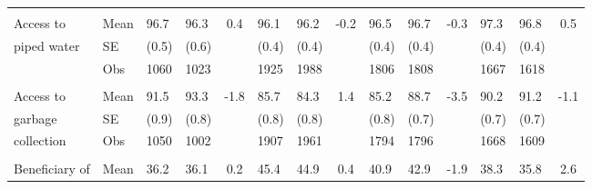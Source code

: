 \documentclass[
	article,			%
	12pt,				%
	oneside,			%
	a4paper,			%
	]{article}
\begin{document}
\begin{table}[h!]
\begin{tabular}{lp{2.335em}p{1.665em}p{1.665em}cp{1.665em}p{1.665em}cp{1.665em}p{1.665em}cp{1.665em}p{1.665em}c}
           &            &            &            &            &            &            &            &            &            &            &            &            &            \\

Access to  &       Mean &       96.7 &       96.3 &        0.4 &       96.1 &       96.2 &       -0.2 &       96.5 &       96.7 &       -0.3 &       97.3 &       96.8 &        0.5 \\

piped water &         SE &      (0.5) &      (0.6) &            &      (0.4) &      (0.4) &            &      (0.4) &      (0.4) &            &      (0.4) &      (0.4) &            \\

           &        Obs &       1060 &       1023 &            &       1925 &       1988 &            &       1806 &       1808 &            &       1667 &       1618 &            \\

           &            &            &            &            &            &            &            &            &            &            &            &            &            \\

Access to  &       Mean &       91.5 &       93.3 &       -1.8 &       85.7 &       84.3 &        1.4 &       85.2 &       88.7 &    -3.5 &       90.2 &       91.2 &       -1.1 \\

  garbage  &         SE &      (0.9) &      (0.8) &            &      (0.8) &      (0.8) &            &      (0.8) &      (0.7) &            &      (0.7) &      (0.7) &            \\

collection &        Obs &       1050 &       1002 &            &       1907 &       1961 &            &       1794 &       1796 &            &       1668 &       1609 &            \\

           &            &            &            &            &            &            &            &            &            &            &            &            &            \\

Beneficiary of  &       Mean &       36.2 &       36.1 &        0.2 &       45.4 &       44.9 &        0.4 &       40.9 &       42.9 &       -1.9 &       38.3 &       35.8 &      2.6 \\


\end{tabular}
\end{table}
\end{document}
